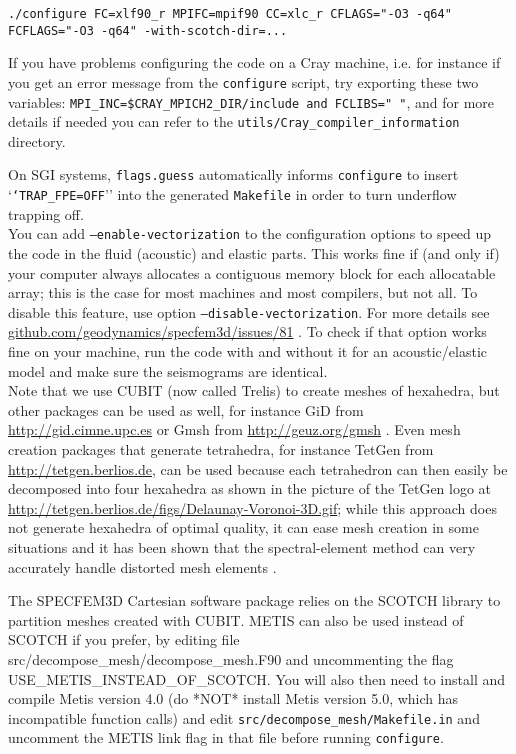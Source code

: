 {\footnotesize
\begin{verbatim}
./configure FC=xlf90_r MPIFC=mpif90 CC=xlc_r CFLAGS="-O3 -q64" FCFLAGS="-O3 -q64" -with-scotch-dir=...
\end{verbatim}
}

If you have problems configuring the code on a Cray machine, i.e. for instance if you get an error message from the \texttt{configure} script, try exporting these two variables:
\texttt{MPI\_INC=\${CRAY\_MPICH2\_DIR}/include and FCLIBS=" "}, and for more details if needed you can refer to the \texttt{utils/Cray\_compiler\_information} directory.

On SGI systems, \texttt{flags.guess} automatically informs \texttt{configure}
to insert `\texttt{`TRAP\_FPE=OFF}'' into the generated \texttt{Makefile}
in order to turn underflow trapping off.\\

You can add \texttt{--enable-vectorization} to the configuration options to speed up the code in the fluid (acoustic) and elastic parts.
This works fine if (and only if) your computer always allocates a contiguous memory block for each allocatable array;
this is the case for most machines and most compilers, but not all. To disable this feature, use option \texttt{--disable-vectorization}.
For more details see \href{https://github.com/geodynamics/specfem3d/issues/81}{github.com/geodynamics/specfem3d/issues/81} .
To check if that option works fine on your machine, run the code with and without it for an acoustic/elastic model and make sure the seismograms are identical.\\

Note that we use CUBIT (now called Trelis) to create meshes of hexahedra, but other packages
can be used as well, for instance GiD from \url{http://gid.cimne.upc.es}
or Gmsh from \url{http://geuz.org/gmsh} \citep{GeRe09}. Even mesh
creation packages that generate tetrahedra, for instance TetGen from
\url{http://tetgen.berlios.de}, can be used because each tetrahedron
can then easily be decomposed into four hexahedra as shown in the
picture of the TetGen logo at \url{http://tetgen.berlios.de/figs/Delaunay-Voronoi-3D.gif};
while this approach does not generate hexahedra of optimal quality,
it can ease mesh creation in some situations and it has been shown
that the spectral-element method can very accurately handle distorted
mesh elements \citep{OlSe11}.

The SPECFEM3D Cartesian software package relies on the SCOTCH library
to partition meshes created with CUBIT. METIS \citep{KaKu98a,KaKu98c,KaKu98b}
can also be used instead of SCOTCH if you prefer, by editing file
src/decompose\_mesh/decompose\_mesh.F90 and uncommenting the flag
USE\_METIS\_INSTEAD\_OF\_SCOTCH. You will also then need to install
and compile Metis version 4.0 (do {*}NOT{*} install Metis version
5.0, which has incompatible function calls) and edit \texttt{src/decompose\_mesh/Makefile.in}
and uncomment the METIS link flag in that file before running \texttt{configure}.\\


